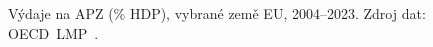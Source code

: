 \providecommand\NudgeEuApzVydajeZOOFCz{0pt}%
\providecommand\NudgeEuApzVydajeZOOFAt{0pt}%
\providecommand\NudgeEuApzVydajeZOOFDe{0pt}%
\providecommand\NudgeEuApzVydajeZOOFDk{0pt}%
\providecommand\NudgeEuApzVydajeZOOFPl{0pt}%
\providecommand\NudgeEuApzVydajeZOOFSk{0pt}%
\providecommand\NudgeEuApzVydajeZOOFCovid{0pt}%
\def\strEuApzVydajeZOOFCaption{Výdaje na \acs{APZ} (\% \acs{HDP}), vybrané země EU, 2004--2023. Zdroj dat: \acs{OECD}~LMP~\cite{oecd_lmpexp_PC_GDP}.}%
%
\begin{figure}[htbp]
  \centering
  \resizebox{0.95\linewidth}{!}{}
  \caption{\strEuApzVydajeZOOFCaption}
  \label{fig:eu_apz_vydaje_2004}
\end{figure}

